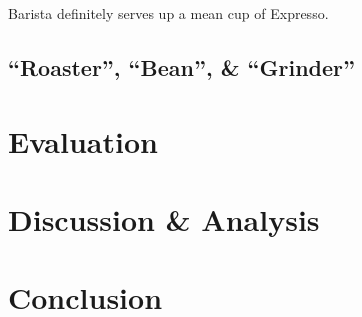 \documentclass{acm_proc_article-sp}
\begin{document}
Barista definitely serves up a mean cup of Expresso.

\subsection{``Roaster'', ``Bean'', \& ``Grinder''}
\label{subsection:roaster}


\section{Evaluation}

\section{Discussion \& Analysis}

\section{Conclusion}



  
%
%


\balancecolumns

\end{document}

